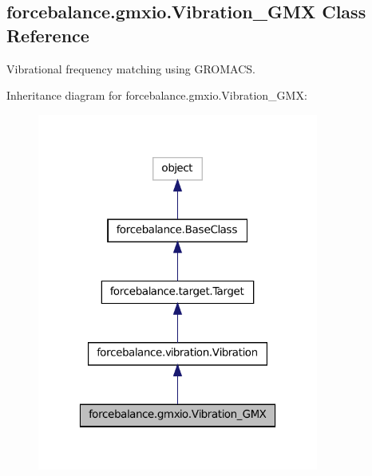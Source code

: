 \hypertarget{classforcebalance_1_1gmxio_1_1Vibration__GMX}{\subsection{forcebalance.\-gmxio.\-Vibration\-\_\-\-G\-M\-X Class Reference}
\label{classforcebalance_1_1gmxio_1_1Vibration__GMX}
}


Vibrational frequency matching using G\-R\-O\-M\-A\-C\-S.  




Inheritance diagram for forcebalance.\-gmxio.\-Vibration\-\_\-\-G\-M\-X\-:
\nopagebreak
\begin{figure}[H]
\begin{center}
\leavevmode
\includegraphics[width=262pt]{classforcebalance_1_1gmxio_1_1Vibration__GMX__inherit__graph}
\end{center}
\end{figure}


